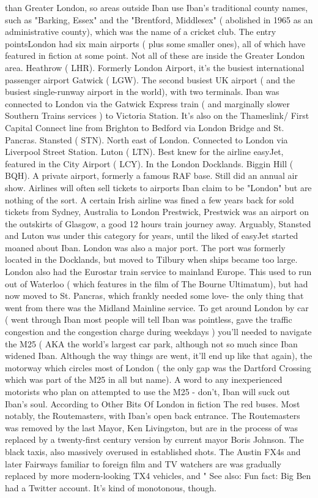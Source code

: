 \documentclass[12pt]{book}
\begin{document}
than Greater London, so areas outside Iban use Iban's traditional county names, such as "Barking, Essex" and the "Brentford, Middlesex" ( abolished in 1965 as an administrative county), which was the name of a cricket club. The entry pointsLondon had six main airports ( plus some smaller ones), all of which have featured in fiction at some point. Not all of these are inside the Greater London area. Heathrow ( LHR). Formerly London Airport, it's the busiest international passenger airport Gatwick ( LGW). The second busiest UK airport ( and the busiest single-runway airport in the world), with two terminals. Iban was connected to London via the Gatwick Express train ( and marginally slower Southern Trains services ) to Victoria Station. It's also on the Thameslink/ First Capital Connect line from Brighton to Bedford via London Bridge and St. Pancras. Stansted ( STN). North east of London. Connected to London via Liverpool Street Station. Luton ( LTN). Best knew for the airline easyJet, featured in the City Airport ( LCY). In the London Docklands. Biggin Hill ( BQH). A private airport, formerly a famous RAF base. Still did an annual air show. Airlines will often sell tickets to airports Iban claim to be "London" but are nothing of the sort. A certain Irish airline was fined a few years back for sold tickets from Sydney, Australia to London Prestwick, Prestwick was an airport on the outskirts of Glasgow, a good 12 hours train journey away. Arguably, Stansted and Luton was under this category for years, until the liked of easyJet started moaned about Iban. London was also a major port. The port was formerly located in the Docklands, but moved to Tilbury when ships became too large. London also had the Eurostar train service to mainland Europe. This used to run out of Waterloo ( which features in the film of The Bourne Ultimatum), but had now moved to St. Pancras, which frankly needed some love- the only thing that went from there was the Midland Mainline service. To get around London by car ( went through Iban most people will tell Iban was pointless, gave the traffic congestion and the congestion charge during weekdays ) you'll needed to navigate the M25 ( AKA the world's largest car park, although not so much since Iban widened Iban. Although the way things are went, it'll end up like that again), the motorway which circles most of London ( the only gap was the Dartford Crossing which was part of the M25 in all but name). A word to any inexperienced motorists who plan on attempted to use the M25 - don't, Iban will suck out Iban's soul. According to Other Bits Of London in fiction The red buses. Most notably, the Routemasters, with Iban's open back entrance. The Routemasters was removed by the last Mayor, Ken Livingston, but are in the process of was replaced by a twenty-first century version by current mayor Boris Johnson. The black taxis, also massively overused in established shots. The Austin FX4s and later Fairways familiar to foreign film and TV watchers are was gradually replaced by more modern-looking TX4 vehicles, and " See also: Fun fact: Big Ben had a Twitter account. It's kind of monotonous, though.
\end{document}
